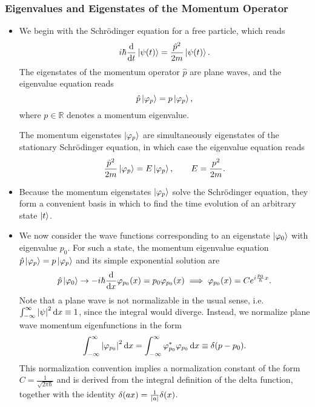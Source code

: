 \documentclass[11pt, a4paper]{article}
\newcommand{\diff}{\mathop{}\!\mathrm{d}} %
\newcommand{\Schro}{Schr\"{o}dinger\xspace}
\begin{document}
\subsubsection{Eigenvalues and Eigenstates of the Momentum Operator}
\begin{itemize}

    \item We begin with the \Schro equation for a free particle, which reads
    \begin{equation*}
        i \hbar \dv{t}\ket{\psi(t)} = \frac{\hat{p}^{2}}{2m} \ket{\psi(t)}.
    \end{equation*}
    The eigenstates of the momentum operator $ \hat{p} $ are plane waves, and the eigenvalue equation reads
    \begin{equation*}
        \hat{p}\ket{\varphi_{p}} = p \ket{\varphi_{p}},
    \end{equation*}
    where $ p \in \mathbb{R} $ denotes a momentum eigenvalue. 

    The momentum eigenstates $ \ket{\varphi_{p}} $ are simultaneously eigenstates of the stationary \Schro equation, in which case the eigenvalue equation reads
    \begin{equation*}
        \frac{\hat{p}^{2}}{2m}\ket{\varphi_{p}} = E \ket{\varphi_{p}}, \qquad E = \frac{p^{2}}{2m}.
    \end{equation*}
    
    \item Because the momentum eigenstates $ \ket{\varphi_{p}} $ solve the \Schro equation, they form a convenient basis in which to find the time evolution of an arbitrary state $ \ket{t} $.
    \item We now consider the wave functions corresponding to an eigenstate $ \ket{\varphi_{0}} $ with eigenvalue $ p_{0} $. For such a state, the momentum eigenvalue equation $ \hat{p}\ket{\varphi_{p}} = p \ket{\varphi_{p}} $ and its simple exponential solution are
    \begin{equation*}
        \hat{p}\ket{\varphi_{0}} \to - i \hbar \dv{x} \varphi_{p_{0}}(x) = p_{0}\varphi_{p_{0}}(x) \implies \varphi_{p_{0}}(x) = C e^{i \frac{p_{0}}{\hbar}x}.
    \end{equation*}
    Note that a plane wave is not normalizable in the usual sense, i.e. $ \int_{-\infty}^{\infty} \abs{\psi}^{2}\diff x \equiv 1 $, since the integral would diverge. Instead, we normalize plane wave momentum eigenfunctions in the form
    \begin{equation*}
        \int_{-\infty}^{\infty}\abs{\varphi_{p_{0}}}^{2} \diff x = \int_{-\infty}^{\infty}\varphi^{*}_{p_{0}} \varphi_{p_{0}}\diff x \equiv \delta(p - p_{0}).
    \end{equation*}
    This normalization convention implies a normalization constant of the form $ C = \frac{1}{\sqrt{2\pi \hbar}} $ and is derived from the integral definition of the delta function, together with the identity $ \delta(ax) = \frac{1}{\abs{a}} \delta(x) $.


\end{itemize}
\end{document}
